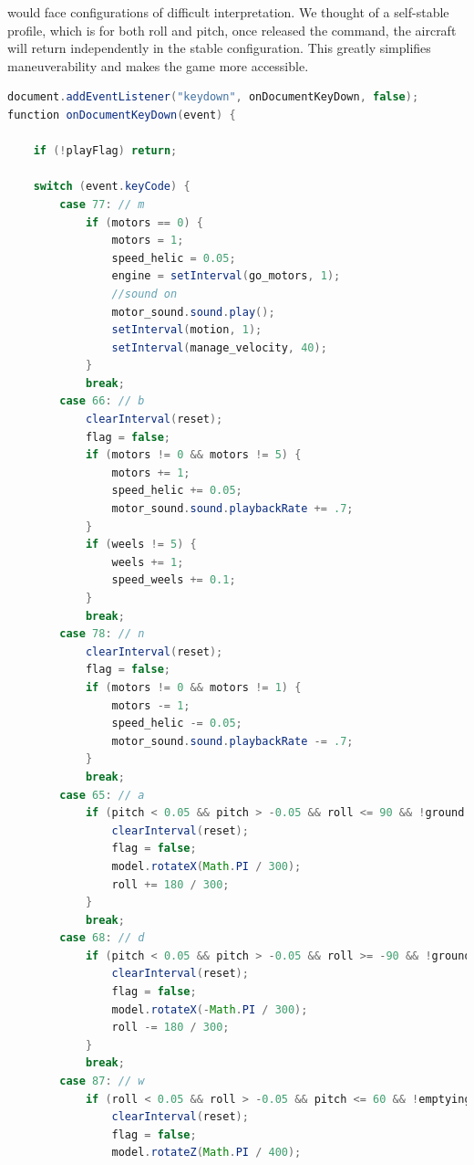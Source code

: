 \documentclass{article}
\begin{document}
would face configurations of difficult interpretation. We thought of a self-stable profile, which is for both roll and pitch, once released the command, the aircraft will return independently in the stable configuration. This greatly simplifies maneuverability and makes the game more accessible.

\newpage

\begin{lstlisting}[language=Java, caption=Manage commands]
document.addEventListener("keydown", onDocumentKeyDown, false);
function onDocumentKeyDown(event) {

    if (!playFlag) return;

    switch (event.keyCode) {
        case 77: // m
            if (motors == 0) {
                motors = 1;
                speed_helic = 0.05;
                engine = setInterval(go_motors, 1);
                //sound on
                motor_sound.sound.play();
                setInterval(motion, 1);
                setInterval(manage_velocity, 40);
            }
            break;
        case 66: // b
            clearInterval(reset);
            flag = false;
            if (motors != 0 && motors != 5) {
                motors += 1;
                speed_helic += 0.05;
                motor_sound.sound.playbackRate += .7;
            }
            if (weels != 5) {
                weels += 1;
                speed_weels += 0.1;
            }
            break;
        case 78: // n
            clearInterval(reset);
            flag = false;
            if (motors != 0 && motors != 1) {
                motors -= 1;
                speed_helic -= 0.05;
                motor_sound.sound.playbackRate -= .7;
            }
            break;
        case 65: // a
            if (pitch < 0.05 && pitch > -0.05 && roll <= 90 && !ground && !emptyingTank && !onLake) {
                clearInterval(reset);
                flag = false;
                model.rotateX(Math.PI / 300);
                roll += 180 / 300;
            }
            break;
        case 68: // d
            if (pitch < 0.05 && pitch > -0.05 && roll >= -90 && !ground && !emptyingTank && !onLake) {
                clearInterval(reset);
                flag = false;
                model.rotateX(-Math.PI / 300);
                roll -= 180 / 300;
            }
            break;
        case 87: // w
            if (roll < 0.05 && roll > -0.05 && pitch <= 60 && !emptyingTank && !onLake && !ground) {
                clearInterval(reset);
                flag = false;
                model.rotateZ(Math.PI / 400);

\end{lstlisting}
\end{document}
